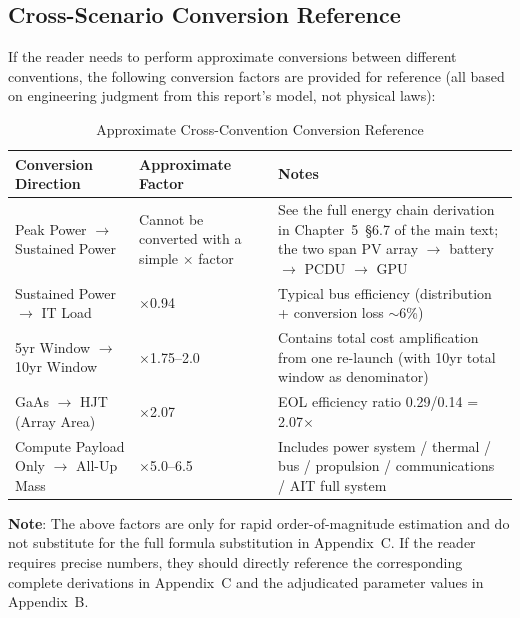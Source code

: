 \subsection{Cross-Scenario Conversion Reference}

If the reader needs to perform approximate conversions between different conventions, the following conversion factors are provided for reference (all based on engineering judgment from this report's model, not physical laws):

\begin{table}[H]
  \centering
  \caption{Approximate Cross-Convention Conversion Reference}
  \label{tab:cross-alignment-conversion}
  \begin{tabularx}{\textwidth}{
    >{\raggedright\arraybackslash}p{2.9cm}
    >{\centering\arraybackslash}p{1.8cm}
    >{\raggedright\arraybackslash}X
  }
  \toprule
  \textbf{Conversion Direction} & \textbf{Approximate Factor} & \textbf{Notes} \\
  \midrule
  Peak Power $\to$ Sustained Power & Cannot be converted with a simple $\times$ factor & See the full energy chain derivation in Chapter~5~\S6.7 of the main text; the two span PV array $\to$ battery $\to$ PCDU $\to$ GPU \\
  Sustained Power $\to$ IT Load & $\times$0.94 & Typical bus efficiency (distribution + conversion loss $\sim$6\%) \\
  5yr Window $\to$ 10yr Window & $\times$1.75--2.0 & Contains total cost amplification from one re-launch (with 10yr total window as denominator) \\
  GaAs $\to$ HJT (Array Area) & $\times$2.07 & EOL efficiency ratio 0.29/0.14 = 2.07$\times$ \\
  Compute Payload Only $\to$ All-Up Mass & $\times$5.0--6.5 & Includes power system / thermal / bus / propulsion / communications / AIT full system \\
  \bottomrule
  \end{tabularx}
\end{table}

\textbf{Note}: The above factors are only for rapid order-of-magnitude estimation and do not substitute for the full formula substitution in Appendix~C. If the reader requires precise numbers, they should directly reference the corresponding complete derivations in Appendix~C and the adjudicated parameter values in Appendix~B.
